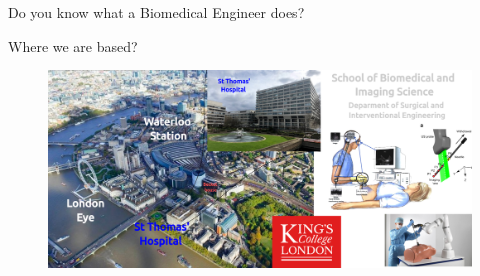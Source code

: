 {
\begin{frame}{}

\BigSizeFont
Do you know what a Biomedical Engineer does?
\end{frame}
}





{
\begin{frame}{Where we are based?}

  \begin{figure}
  \centering
  \includegraphics[width=1.0\textwidth]{./figures/where-we-are-based/versions/drawing-v02.png}
  \end{figure}

\end{frame}
}
